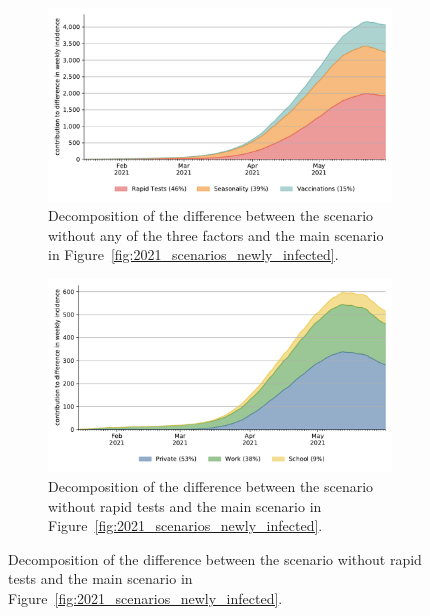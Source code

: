 \begin{figure}[!tp]
    \begin{subfigure}[b]{0.475\textwidth}
        \centering
        \includegraphics[width=\textwidth]{../figures/results/figures/full_decomposition_channels_area}
        \caption{Decomposition of the difference between the scenario without any of the
            three factors and the main scenario in
            Figure~\ref{fig:2021_scenarios_newly_infected}.}
        \label{fig:2021_scenarios_decomposition}
    \end{subfigure}
    \hfill
    \begin{subfigure}[b]{0.475\textwidth}
        \centering
        \includegraphics[width=\textwidth]{../figures/results/figures/full_decomposition_rapid_tests_area}
        \caption{Decomposition of the difference between the scenario without rapid
            tests and the main scenario in Figure~\ref{fig:2021_scenarios_newly_infected}.}
        \label{fig:2021_scenarios_decomposition_tests}
    \end{subfigure}


\end{figure}
